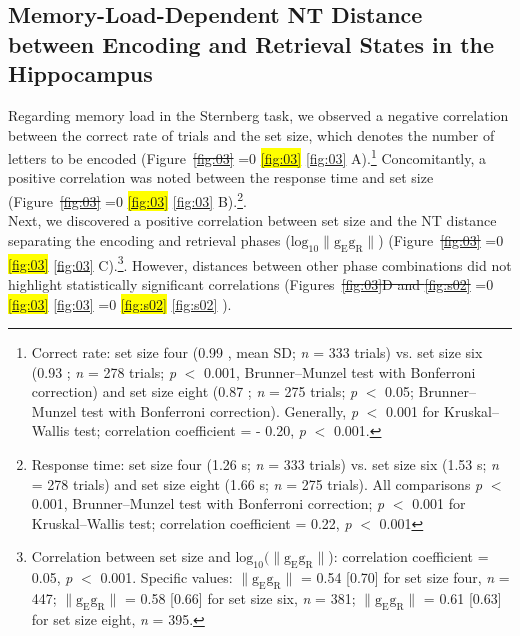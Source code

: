 \documentclass[preprint,review,12pt]{elsarticle}%
\newcommand{\hl}[1]{\colorbox{yellow}{#1}} %
\newcommand{\hlref}[1]{%
  \ifnum\getrefnumber{#1}=0 %
    \hl{\ref*{#1}}%
  \else %
    \ref{#1}%
  \fi %
} %
\providecommand{\DIFaddtex}[1]{{\protect\color{blue}\uwave{#1}}} %
\providecommand{\DIFdeltex}[1]{{\protect\color{red}\sout{#1}}}                      %
\providecommand{\DIFaddbegin}{} %
\providecommand{\DIFaddend}{} %
\providecommand{\DIFdelbegin}{} %
\providecommand{\DIFdelend}{} %
\providecommand{\DIFadd}[1]{\texorpdfstring{\DIFaddtex{#1}}{#1}} %
\providecommand{\DIFdel}[1]{\texorpdfstring{\DIFdeltex{#1}}{}} %
\newcommand{\DIFscaledelfig}{0.5}
\newlength{\DIFdelgraphicswidth} %
\newlength{\DIFdelgraphicsheight} %
\newcommand{\DIFaddincludegraphics}[2][]{{\color{blue}\fbox{\DIFOincludegraphics[#1]{#2}}}} %
\newcommand{\DIFdelincludegraphics}[2][]{%
\sbox{\DIFdelgraphicsbox}{\DIFOincludegraphics[#1]{#2}}%
\settoboxwidth{\DIFdelgraphicswidth}{\DIFdelgraphicsbox} %
\settoboxtotalheight{\DIFdelgraphicsheight}{\DIFdelgraphicsbox} %
\scalebox{\DIFscaledelfig}{%
\parbox[b]{\DIFdelgraphicswidth}{\usebox{\DIFdelgraphicsbox}\\[-\baselineskip] \rule{\DIFdelgraphicswidth}{0em}}\llap{\resizebox{\DIFdelgraphicswidth}{\DIFdelgraphicsheight}{%
\setlength{\unitlength}{\DIFdelgraphicswidth}%
\begin{picture}(1,1)%
\thicklines\linethickness{2pt} %
{\color[rgb]{1,0,0}\put(0,0){\framebox(1,1){}}}%
{\color[rgb]{1,0,0}\put(0,0){\line( 1,1){1}}}%
{\color[rgb]{1,0,0}\put(0,1){\line(1,-1){1}}}%
\end{picture}%
}\hspace*{3pt}}} %
} %
\DeclareRobustCommand{\DIFaddbegin}{\DIFOaddbegin \let\includegraphics\DIFaddincludegraphics} %
\DeclareRobustCommand{\DIFaddend}{\DIFOaddend \let\includegraphics\DIFOincludegraphics} %
\DeclareRobustCommand{\DIFdelbegin}{\DIFOdelbegin \let\includegraphics\DIFdelincludegraphics} %
\DeclareRobustCommand{\DIFdelend}{\DIFOaddend \let\includegraphics\DIFOincludegraphics} %
\begin{document}
\subsection{Memory-Load-Dependent NT Distance between Encoding and Retrieval States in the Hippocampus}
Regarding memory load in the Sternberg task, we observed a negative correlation between the correct rate of trials and the set size, which denotes the number of letters to be encoded (Figure~\DIFdelbegin \DIFdel{\ref{fig:03}}\DIFdelend \DIFaddbegin \hlref{fig:03}\DIFaddend A).\footnote{Correct rate: set size four (0.99 , mean \textpm SD; \textit{n} = 333 trials) vs. set size six (0.93 ; \textit{n} = 278 trials; \textit{p} $<$ 0.001, Brunner--Munzel test with Bonferroni correction) and set size eight (0.87 ; \textit{n} = 275 trials; \textit{p} $<$ 0.05; Brunner--Munzel test with Bonferroni correction). Generally, \textit{p} $<$ 0.001 for Kruskal--Wallis test; correlation coefficient = - 0.20, \textit{p} $<$ 0.001.} Concomitantly, a positive correlation was noted between the response time and set size (Figure~\DIFdelbegin \DIFdel{\ref{fig:03}}\DIFdelend \DIFaddbegin \hlref{fig:03}\DIFaddend B).\footnote{Response time: set size four (1.26  s; \textit{n} = 333 trials) vs. set size six (1.53  s; \textit{n} = 278 trials) and set size eight (1.66  s; \textit{n} = 275 trials). All comparisons \textit{p} $<$ 0.001, Brunner--Munzel test with Bonferroni correction; \textit{p} $<$ 0.001 for Kruskal--Wallis test; correlation coefficient = 0.22, \textit{p} $<$ 0.001}.
\\
\indent
Next, we discovered a positive correlation between set size and the NT distance separating the encoding and retrieval phases ($\mathrm{log_{10}\lVert g_{E}g_{R} \rVert}$) (Figure~\DIFdelbegin \DIFdel{\ref{fig:03}}\DIFdelend \DIFaddbegin \hlref{fig:03}\DIFaddend C).\footnote{Correlation between set size and $\mathrm{log_{10}(\lVert g_{E}g_{R} \rVert}$): correlation coefficient = 0.05, \textit{p} $<$ 0.001. Specific values: $\mathrm{\lVert g_{E}g_{R} \rVert}$ = 0.54 [0.70] for set size four, \textit{n} = 447; $\mathrm{\lVert g_{E}g_{R} \rVert}$ = 0.58 [0.66] for set size six, \textit{n} = 381; $\mathrm{\lVert g_{E}g_{R} \rVert}$ = 0.61 [0.63] for set size eight, \textit{n} = 395.}. However, distances between other phase combinations did not highlight statistically significant correlations (Figures~\DIFdelbegin \DIFdel{\ref{fig:03}D and \ref{fig:s02}}\DIFdelend \DIFaddbegin \hlref{fig:03}\DIFadd{D and }\hlref{fig:s02}\DIFaddend ).
\end{document}
